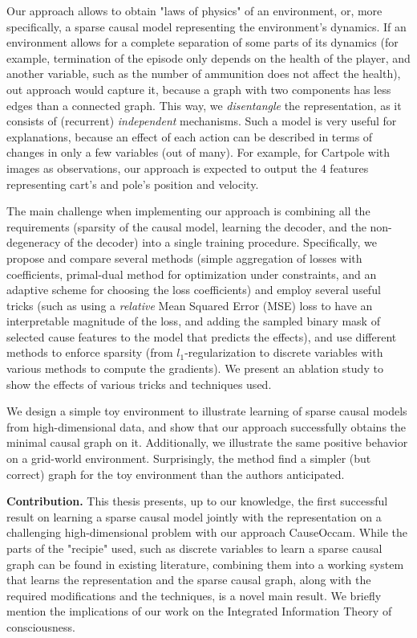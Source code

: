 \documentclass[a4paper,11pt,oneside]{report}
\newcommand{\sysname}{CauseOccam\xspace}
\begin{document}
Our approach allows to obtain "laws of physics" of an environment, or, more specifically, a sparse causal model representing the environment's dynamics.
If an environment allows for a complete separation of some parts of its dynamics (for example, termination of the episode only depends on the health of the player, and another variable, such as the number of ammunition does not affect the health), out approach would capture it, because a graph with two components has less edges than a connected graph. This way, we {\em disentangle} the representation, as it consists of (recurrent) {\em independent} mechanisms.
Such a model is very useful for explanations, because an effect of each action can be described in terms of changes in only a few variables (out of many). For example, for Cartpole with images as observations, our approach is expected to output the 4 features representing cart's and pole's position and velocity.

The main challenge when implementing our approach is combining all the requirements (sparsity of the causal model, learning the decoder, and the non-degeneracy of the decoder) into a single training procedure. Specifically, we propose and compare several methods (simple aggregation of losses with coefficients, primal-dual method for optimization under constraints, and an adaptive scheme for choosing the loss coefficients) and employ several useful tricks (such as using a {\em relative} Mean Squared Error (MSE) loss to have an interpretable magnitude of the loss, and adding the sampled binary mask of selected cause features to the model that predicts the effects), and use different methods to enforce sparsity (from $l_1$-regularization to discrete variables with various methods to compute the gradients). We present an ablation study to show the effects of various tricks and techniques used.

We design a simple toy environment to illustrate learning of sparse causal models from high-dimensional data, and show that our approach successfully obtains the minimal causal graph on it. Additionally, we illustrate the same positive behavior on a grid-world environment. Surprisingly, the method find a simpler (but correct) graph for the toy environment than the authors anticipated.

{\bf Contribution.} This thesis presents, up to our knowledge, the first successful result on learning a sparse causal model jointly with the representation on a challenging high-dimensional problem with our approach \sysname. While the parts of the "recipie" used, such as discrete variables to learn a sparse causal graph can be found in existing literature, combining them into a working system that learns the representation and the sparse causal graph, along with the required modifications and the techniques, is a novel main result. We briefly mention the implications of our work on the Integrated Information Theory of consciousness.
\end{document}
